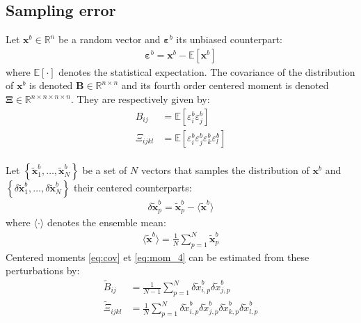 \documentclass[12pt]{scrartcl}
\begin{document}
\subsection{Sampling error}
Let $\mathbf{x}^b \in \mathbb{R}^n$ be a random vector and $\boldsymbol{\varepsilon}^b$ its unbiased counterpart:
\begin{align}
\boldsymbol{\varepsilon}^b = \mathbf{x}^b - \mathbb{E} \left[\mathbf{x}^b\right]
\end{align}
where $\mathbb{E} [\cdot]$ denotes the statistical expectation. The covariance of the distribution of $\mathbf{x}^b$ is denoted $\mathbf{B} \in \mathbb{R}^{n \times n}$ and its fourth order centered moment is denoted $\boldsymbol{\Xi} \in \mathbb{R}^{n \times n \times n \times n}$. They are respectively given by:
\begin{subequations}
\begin{align}
\label{eq:cov}
B_{ij} & = \mathbb{E}\left[\varepsilon^b_i \varepsilon^b_j\right] \\
\label{eq:mom_4}
\Xi_{ijkl} & = \mathbb{E}\left[\varepsilon^b_i \varepsilon^b_j \varepsilon^b_k \varepsilon^b_l\right]
\end{align}
\end{subequations}
$  $\\
Let $\left\{\widetilde{\mathbf{x}}^b_1,\dots,\widetilde{\mathbf{x}}^b_N\right\}$ be a set of $N$ vectors that samples the distribution of $\mathbf{x}^b$ and $\left\{\delta \widetilde{\mathbf{x}}^b_1,\dots,\delta \widetilde{\mathbf{x}}^b_N\right\}$ their centered counterparts:
\begin{align}
\delta \widetilde{\mathbf{x}}^b_p = \widetilde{\mathbf{x}}^b_p - \langle \widetilde{\mathbf{x}}^b \rangle
\end{align}
where $\langle \cdot \rangle$ denotes the ensemble mean:
\begin{align}
\label{eq:exp_estim}
\langle \widetilde{\mathbf{x}}^b \rangle = \frac{1}{N} \sum_{p=1}^N \widetilde{\mathbf{x}}^b_p
\end{align}
Centered moments \eqref{eq:cov} et \eqref{eq:mom_4} can be estimated from these perturbations by:
\begin{subequations}
\begin{align}
\label{eq:cov_estim}
\widetilde{B}_{ij} & = \frac{1}{N-1} \sum_{p=1}^N \delta \widetilde{x}^b_{i,p} \delta \widetilde{x}^b_{j,p}  \\
\label{eq:mom_4_estim}
\widetilde{\Xi}_{ijkl} & = \frac{1}{N} \sum_{p=1}^N \delta \widetilde{x}^b_{i,p} \delta \widetilde{x}^b_{j,p} \delta \widetilde{x}^b_{k,p} \delta \widetilde{x}^b_{l,p}
\end{align}
\end{subequations}
\end{document}
